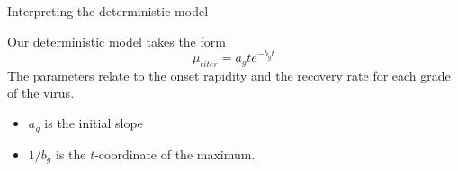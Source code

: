 \documentclass[
  ignorenonframetext,
]{beamer}
\newenvironment{Shaded}{\begin{snugshade}}{\end{snugshade}}
\newcommand{\ControlFlowTok}[1]{\textcolor[rgb]{0.13,0.29,0.53}{\textbf{#1}}}
\newcommand{\DecValTok}[1]{\textcolor[rgb]{0.00,0.00,0.81}{#1}}
\newcommand{\KeywordTok}[1]{\textcolor[rgb]{0.13,0.29,0.53}{\textbf{#1}}}
\newcommand{\NormalTok}[1]{#1}
\newcommand{\OperatorTok}[1]{\textcolor[rgb]{0.81,0.36,0.00}{\textbf{#1}}}
\newcommand{\StringTok}[1]{\textcolor[rgb]{0.31,0.60,0.02}{#1}}
\providecommand{\tightlist}{%
  \setlength{\itemsep}{0pt}\setlength{\parskip}{0pt}}
\begin{document}
\begin{frame}[fragile]{Interpreting the deterministic model}
\protect\hypertarget{interpreting-the-deterministic-model}{}

Our deterministic model takes the form \[
\mu_{titer}=a_{g}te^{-b_{g}t}
\] The parameters relate to the onset rapidity and the recovery rate for
each grade of the virus.

\begin{itemize}
\tightlist
\item
  \(a_g\) is the initial slope
\item
  \(1/b_g\) is the \(t\)-coordinate of the maximum.
\end{itemize}

\scriptsize

\begin{Shaded}
\end{Shaded}

\end{frame}
\end{document}
